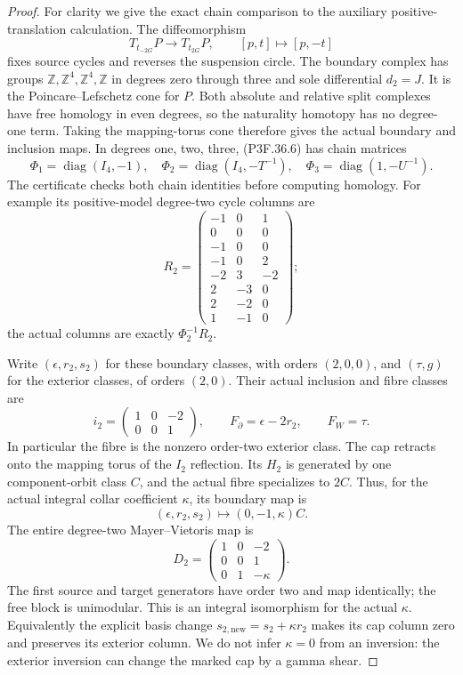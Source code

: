 \begin{proof}
For clarity we give the exact chain comparison to the auxiliary
positive-translation calculation. The diffeomorphism
\[
 T_{t_{-2G}}P\longrightarrow T_{t_{2G}}P,
                     \qquad[p,t]\longmapsto[p,-t]             \tag{P3F.36.6}
\]
fixes source cycles and reverses the suspension circle. The boundary
complex has groups \(\mathbb Z,\mathbb Z^4,\mathbb Z^4,
\mathbb Z\) in degrees zero through three and sole differential
\(d_2=J\). It is the Poincare--Lefschetz cone for \(P\).
Both absolute and relative split complexes have free homology in
even degrees, so the naturality homotopy has no degree-one term.
Taking the mapping-torus cone therefore gives the actual boundary
and inclusion maps. In degrees one, two, three, (P3F.36.6) has
chain matrices
\[
 \Phi_1=\operatorname{diag}(I_4,-1),\quad
 \Phi_2=\operatorname{diag}(I_4,-T^{-1}),\quad
 \Phi_3=\operatorname{diag}(1,-U^{-1}).
\]
The certificate checks both chain identities before computing
homology. For example its positive-model degree-two cycle columns
are
\[
 R_2=\begin{pmatrix}
 -1&0&1\\0&0&0\\-1&0&0\\-1&0&2\\
 -2&3&-2\\2&-3&0\\2&-2&0\\1&-1&0
 \end{pmatrix};
\]
the actual columns are exactly \(\Phi_2^{-1}R_2\).

Write \((\epsilon,r_2,s_2)\) for these boundary classes,
with orders \((2,0,0)\), and \((\tau,g)\) for the exterior
classes, of orders \((2,0)\). Their actual inclusion and fibre
classes are
\[
 i_2=\begin{pmatrix}1&0&-2\\0&0&1\end{pmatrix},\qquad
 F_{\partial}=\epsilon-2r_2,\qquad F_W=\tau.                  \tag{P3F.36.7}
\]
In particular the fibre is the nonzero order-two exterior class.
The cap retracts onto the mapping torus of the \(I_2\) reflection.
Its \(H_2\) is generated by one component-orbit class \(C\),
and the actual fibre specializes to \(2C\). Thus, for the actual
integral collar coefficient \(\kappa\), its boundary map is
\[
             (\epsilon,r_2,s_2)\longmapsto(0,-1,\kappa)C.
\]
The entire degree-two Mayer--Vietoris map is
\[
 D_2=\begin{pmatrix}
 1&0&-2\\0&0&1\\0&1&-\kappa
 \end{pmatrix}.                                               \tag{P3F.36.8}
\]
The first source and target generators have order two and map
identically; the free block is unimodular. This is an integral
isomorphism for the actual \(\kappa\). Equivalently the explicit
basis change \(s_{2,\mathrm{new}}=s_2+\kappa r_2\) makes its
cap column zero and preserves its exterior column. We do not infer
\(\kappa=0\) from an inversion: the exterior inversion can
change the marked cap by a gamma shear.


\end{proof}
